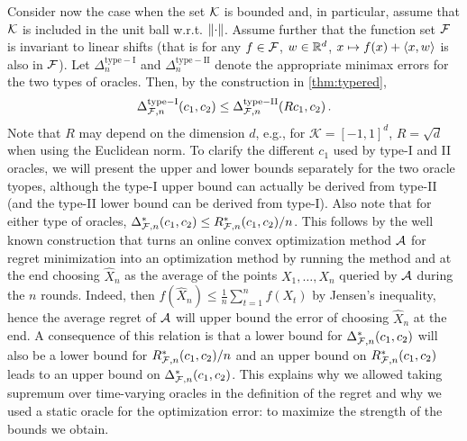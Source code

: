 Consider now the case when the set $\mathcal{K}$ is bounded and, in particular, assume that 
$\mathcal{K}$ is included in the unit ball w.r.t. $\left\|\cdot\right\|$.
Assume further that the function set $\mathcal{F}$ is invariant to linear shifts
(that is for any $f\in \mathcal{F}$, $w\in \mathbb{R}^d$, $x\mapsto f(x) + \langle x,w \rangle$ is also in $\mathcal{F}$).
Let
 $\Delta_{n}^{\mathrm{type-I}}$ and $\Delta_{n}^{\mathrm{type-II}}$ denote  the appropriate minimax errors for the two types of oracles.
Then, by the construction in  \cref{thm:typered},
\begin{align}
\Delta_{\mathcal{F},n}^{\mathrm{type-I}}(c_1,c_2) \le \Delta_{\mathcal{F},n}^{\mathrm{type-II}}(Rc_1,c_2)\,.
\end{align}
Note that $R$ may depend on the dimension $d$, e.g., for $\mathcal{K} = \left[ -1,1 \right]^d$, $R = \sqrt{d}$ when using the Euclidean norm. To clarify the different $c_1$ used by type-I and II oracles, we will present the upper and lower bounds separately for the two oracle tyopes, although the type-I upper bound can actually be derived from type-II (and the type-II lower bound can be derived from type-I). 
Also note that for either type of oracles, $\Delta_{\mathcal{F},n}^*(c_1,c_2) \le R_{\mathcal{F},n}^*(c_1,c_2)/n$. This follows by the well known construction that turns an online convex optimization method $\mathcal{A}$ for regret minimization into an optimization method by running the method and at the end choosing $\hat{X}_n$ as the average of the points $X_1,\dots,X_n$ queried by $\mathcal{A}$ during the $n$ rounds.
Indeed, then $f(\hat{X}_n) \le \frac1n \sum_{t=1}^n f(X_t)$ by Jensen's inequality, hence the average regret of $\mathcal{A}$ will upper bound the error of choosing $\hat{X}_n$ at the end.
A consequence of this relation is that a lower bound for $\Delta_{\mathcal{F},n}^*(c_1,c_2) $ will also be a lower bound for $R^*_{\mathcal{F},n}(c_1,c_2)/n$ and an upper bound on $R^*_{\mathcal{F},n}(c_1,c_2)$ leads to an upper bound on $\Delta_{\mathcal{F},n}^*(c_1,c_2)$. This explains why we allowed taking supremum over time-varying oracles in the definition of the regret and why we used a static oracle for the optimization error: to maximize the strength of the bounds we obtain.

